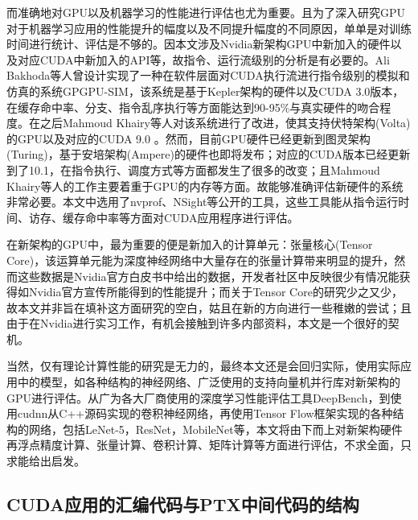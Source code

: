 \par 而准确地对GPU以及机器学习的性能进行评估也尤为重要。且为了深入研究GPU对于机器学习应用的性能提升的幅度以及不同提升幅度的不同原因，单单是对训练时间进行统计、评估是不够的。因本文涉及Nvidia新架构GPU中新加入的硬件以及对应CUDA中新加入的API等，故指令、运行流级别的分析是有必要的。Ali Bakhoda等人曾设计实现了一种在软件层面对CUDA执行流进行指令级别的模拟和仿真的系统GPGPU-SIM，该系统是基于Kepler架构的硬件以及CUDA 3.0版本，在缓存命中率、分支、指令乱序执行等方面能达到90-95\%与真实硬件的吻合程度\parencite{GPGPUSIM}。在之后Mahmoud Khairy等人对该系统进行了改进，使其支持伏特架构(Volta)的GPU以及对应的CUDA 9.0 \parencite{GPGPUSIM2}。然而，目前GPU硬件已经更新到图灵架构(Turing)，基于安培架构(Ampere)的硬件也即将发布；对应的CUDA版本已经更新到了10.1，在指令执行、调度方式等方面都发生了很多的改变；且Mahmoud Khairy等人的工作主要着重于GPU的内存等方面。故能够准确评估新硬件的系统非常必要。本文中选用了nvprof、NSight等公开的工具，这些工具能从指令运行时间、访存、缓存命中率等方面对CUDA应用程序进行评估\parencite{NSIGHT}。
\par 在新架构的GPU中，最为重要的便是新加入的计算单元：张量核心(Tensor Core)，该运算单元能为深度神经网络中大量存在的张量计算带来明显的提升\parencite{VOLTAWHITEPAPER}，然而这些数据是Nvidia官方白皮书中给出的数据，开发者社区中反映很少有情况能获得如Nvidia官方宣传所能得到的性能提升；而关于Tensor Core的研究少之又少，故本文并非旨在填补这方面研究的空白，姑且在新的方向进行一些稚嫩的尝试；且由于在Nvidia进行实习工作，有机会接触到许多内部资料，本文是一个很好的契机。
\par 当然，仅有理论计算性能的研究是无力的，最终本文还是会回归实际，使用实际应用中的模型，如各种结构的神经网络、广泛使用的支持向量机并行库对新架构的GPU进行评估。从广为各大厂商使用的深度学习性能评估工具DeepBench\parencite{DEEPBENCH}，到使用cudnn从C++源码实现的卷积神经网络，再使用Tensor Flow框架实现的各种结构的网络，包括LeNet-5\parencite{LENET}，ResNet\parencite{RESNET}，MobileNet\parencite{MOBILE}等，本文将由下而上对新架构硬件再浮点精度计算、张量计算、卷积计算、矩阵计算等方面进行评估，不求全面，只求能给出启发。

\subsection{CUDA应用的汇编代码与PTX中间代码的结构}

